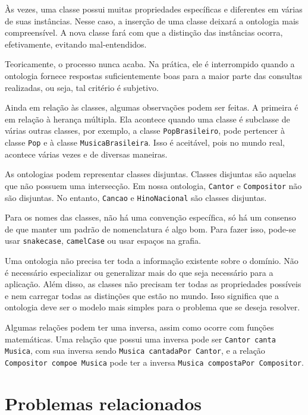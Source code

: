 Às vezes, uma classe possui muitas propriedades específicas e diferentes em várias de suas instâncias. Nesse caso, a inserção de uma classe deixará a ontologia mais compreensível. A nova classe fará com que a distinção das instâncias ocorra, efetivamente, evitando mal-entendidos.

Teoricamente, o processo nunca acaba. Na prática, ele é interrompido quando a ontologia fornece respostas suficientemente boas para a maior parte das consultas realizadas, ou seja, tal critério é subjetivo.

Ainda em relação às classes, algumas observações podem ser feitas. A primeira é em relação à herança múltipla. Ela acontece quando uma classe é subclasse de várias outras classes, por exemplo, a classe \texttt{PopBrasileiro}, pode pertencer à classe \texttt{Pop} e à classe \texttt{MusicaBrasileira}. Isso é aceitável, pois no mundo real, acontece várias vezes e de diversas maneiras.

As ontologias podem representar classes disjuntas. Classes disjuntas são aquelas que não possuem uma intersecção. Em nossa ontologia, \texttt{Cantor} e \texttt{Compositor} não são disjuntas. No entanto, \texttt{Cancao} e \texttt{HinoNacional} são classes disjuntas.

Para os nomes das classes, não há uma convenção específica, só há um consenso de que manter um padrão de nomenclatura é algo bom. Para fazer isso, pode-se usar \texttt{snake\textunderscore case}, \texttt{camelCase} ou usar espaços na grafia.

Uma ontologia não precisa ter toda a informação existente sobre o domínio. Não é necessário especializar ou generalizar mais do que seja necessário para a aplicação. Além disso, as classes não precisam ter todas as propriedades possíveis e nem carregar todas as distinções que estão no mundo. Isso significa que a ontologia deve ser o modelo mais simples para o problema que se deseja resolver.

Algumas relações podem ter uma inversa, assim como ocorre com funções matemáticas. Uma relação que possui uma inversa pode ser \texttt{Cantor canta Musica}, com sua inversa sendo \texttt{Musica cantadaPor Cantor}, e a relação \texttt{Compositor compoe Musica} pode ter a inversa \texttt{Musica compostaPor Compositor}.

\section{Problemas relacionados}

